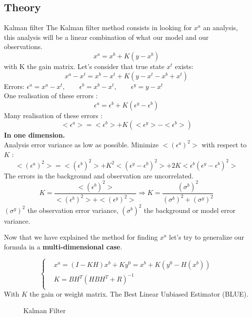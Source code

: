    \subsection{Theory}
   \begin{frame}[allowframebreaks]{Kalman filter}
       The Kalman filter method consists in looking for $x^a$ an analysis, this analysis will be a linear combination of what our model and our observations.
       \begin{equation}
           x^a=x^b+K(y-x^b)
           \label{eq1}
       \end{equation}
       with K the gain matrix.
       \newline Let’s consider that true state $x^t$ exists:
       \begin{equation}
           x^a-x^t=x^b-x^t+K(y-x^t-x^b+x^t)
       \end{equation}
       Errors: \qquad $\epsilon^a=x^a-x^t,\qquad \epsilon^b=x^b-x^t, \qquad \epsilon^y=y-x^t$ \\
       One realisation of these errors :
       \begin{equation}
           \epsilon^a=\epsilon^b+K(\epsilon^y-\epsilon^b)
       \end{equation}
       Many realisation of these errors :
       \begin{equation}
           <\epsilon^a>=<\epsilon^b>+K(<\epsilon^y>-<\epsilon^b>)
       \end{equation}
       \newpage
       \textbf{In one dimension.} \\
       Analysis error variance as low as possible.
       \newline Minimize $<(\epsilon^a)^2>$ with respect to $K$ :
       $$<(\epsilon^a)^2>=<(\epsilon^b)^2>+K^2<(\epsilon^y-\epsilon^b)^2>+2K<\epsilon^b(\epsilon^y-\epsilon^b)^2>$$
       The errors in the background and observation are uncorrelated.
       $$K=\frac{<(\epsilon^b)^2>}{<(\epsilon^b)^2>+<(\epsilon^y)^2>} \Rightarrow K=\frac{(\sigma^b)^2}{(\sigma^b)^2+(\sigma^y)^2} $$
       $(\sigma^y)^2$ the observation error variance, \newline $(\sigma^b)^2$ the background or model error variance.
   
       \newpage
       Now that we have explained the method for finding $x^a$ let's try to generalize our formula in a \textbf{multi-dimensional case}.
   
       $$\left\{\begin{aligned}
     &x^a=(I-KH)x^b+Ky^0=x^b+K(y^0-H(x^b)) \\
           &K=BH^T(HBH^T+R)^{-1} \\
    \end{aligned}\right.$$
       With $K$ the gain or weight matrix.
       The Best Linear Unbiased Estimator (BLUE).
       \begin{figure}[H]
           \caption{Kalman Filter}
       \end{figure}
   \end{frame}
